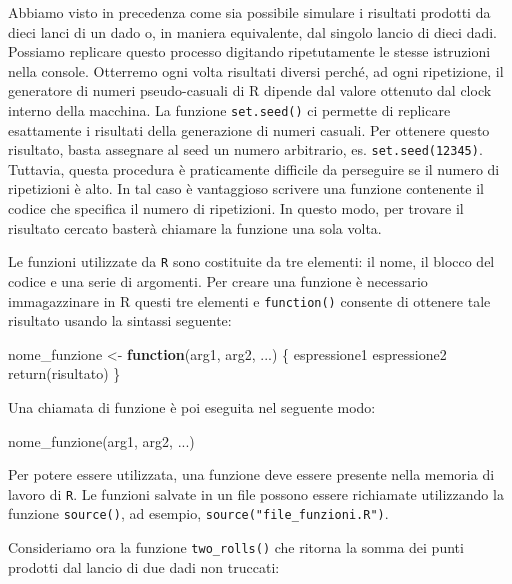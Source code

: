 \documentclass[
]{memoir}
\newenvironment{Shaded}{\begin{snugshade}}{\end{snugshade}}
\newcommand{\ControlFlowTok}[1]{\textcolor[rgb]{0.13,0.29,0.53}{\textbf{#1}}}
\newcommand{\FunctionTok}[1]{\textcolor[rgb]{0.00,0.00,0.00}{#1}}
\newcommand{\NormalTok}[1]{#1}
\newcommand{\OtherTok}[1]{\textcolor[rgb]{0.56,0.35,0.01}{#1}}
\theoremstyle{definition}
\theoremstyle{definition}
\theoremstyle{definition}
\theoremstyle{definition}
\theoremstyle{remark}
\begin{document}
Abbiamo visto in precedenza come sia possibile simulare i risultati
prodotti da dieci lanci di un dado o, in maniera equivalente, dal
singolo lancio di dieci dadi. Possiamo replicare questo processo
digitando ripetutamente le stesse istruzioni nella console. Otterremo
ogni volta risultati diversi perché, ad ogni ripetizione, il generatore
di numeri pseudo-casuali di R dipende dal valore ottenuto dal clock
interno della macchina. La funzione \texttt{set.seed()} ci permette di
replicare esattamente i risultati della generazione di numeri casuali.
Per ottenere questo risultato, basta assegnare al seed un numero
arbitrario, es. \texttt{set.seed(12345)}. Tuttavia, questa procedura è
praticamente difficile da perseguire se il numero di ripetizioni è alto.
In tal caso è vantaggioso scrivere una funzione contenente il codice che
specifica il numero di ripetizioni. In questo modo, per trovare il
risultato cercato basterà chiamare la funzione una sola volta.

Le funzioni utilizzate da \texttt{R} sono costituite da tre elementi: il nome, il blocco del
codice e una serie di argomenti. Per creare una funzione è necessario
immagazzinare in R questi tre elementi e \texttt{function()} consente di
ottenere tale risultato usando la sintassi seguente:

\begin{Shaded}
\begin{Highlighting}[]
\NormalTok{nome\_funzione }\OtherTok{\textless{}{-}} \ControlFlowTok{function}\NormalTok{(arg1, arg2, ...) \{}
\NormalTok{  espressione1}
\NormalTok{  espressione2}
  \FunctionTok{return}\NormalTok{(risultato)}
\NormalTok{\}}
\end{Highlighting}
\end{Shaded}

Una chiamata di funzione è poi eseguita nel seguente modo:

\begin{Shaded}
\begin{Highlighting}[]
\FunctionTok{nome\_funzione}\NormalTok{(arg1, arg2, ...)}
\end{Highlighting}
\end{Shaded}

Per potere essere utilizzata, una funzione deve essere presente nella
memoria di lavoro di \texttt{R}. Le funzioni salvate in un file possono essere
richiamate utilizzando la funzione \texttt{source()}, ad esempio,
\texttt{source("file\_funzioni.R")}.

Consideriamo ora la funzione \texttt{two\_rolls()} che ritorna la somma dei
punti prodotti dal lancio di due dadi non truccati:
\end{document}
